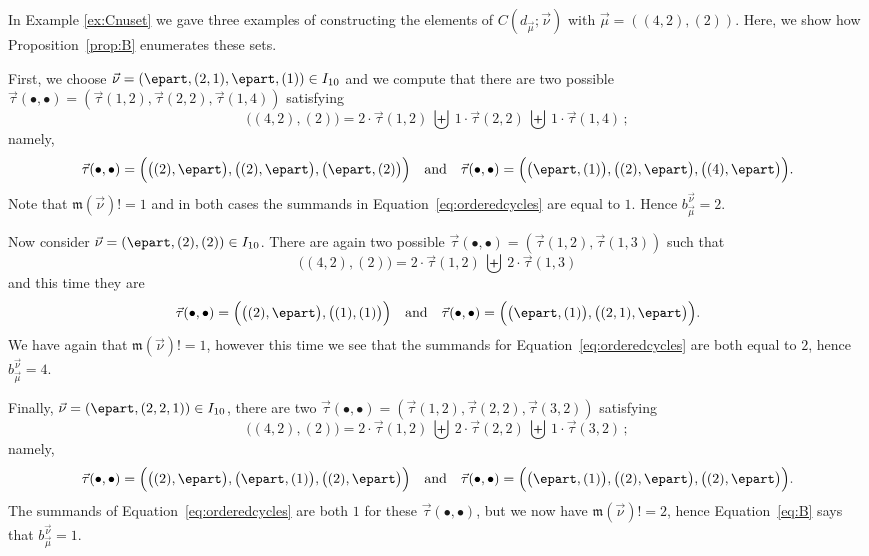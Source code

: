 \begin{example}  In Example \ref{ex:Cnuset} we gave three examples of
constructing the elements of $C( d_{\vec{\mu}}; \vec{\nu})$ with $\vec{\mu} = ((4,2), (2))$.
Here, we show
how Proposition~\ref{prop:B} enumerates these sets.

First, we choose $\vec{\nu} = (\epart, (2,1), \epart, (1)) \in I_{10}$
and we compute that there are two possible
$\vec{\tau}(\bullet, \bullet) = (\vec{\tau}(1,2), \vec{\tau}(2,2), \vec{\tau}(1,4))$
satisfying
\[
    \big((4, 2), (2)\big) =
    2 \cdot \vec{\tau}(1,2)~\biguplus~1 \cdot \vec{\tau}(2,2)~\biguplus~1 \cdot \vec{\tau}(1,4) \,;
\]
namely,
\begin{equation*}
    \vec{\tau}(\bullet, \bullet) = \Big(\big((2), \epart\big), \big((2), \epart\big), \big(\epart, (2)\big)\Big)
    \quad\text{and}\quad
    \vec{\tau}(\bullet, \bullet) = \Big(\big(\epart, (1)\big), \big((2), \epart \big), \big((4), \epart\big)\Big).
\end{equation*}
Note that $\mathfrak{m}(\vec{\nu})! = 1$ and in both cases
the summands in Equation~\eqref{eq:orderedcycles} are equal to $1$.
Hence $b_{\vec{\mu}}^{\vec{\nu}} = 2$.

Now consider $\vec{\nu} = (\epart, (2), (2)) \in I_{10}$.
There are again two possible $\vec{\tau}(\bullet, \bullet) = (\vec{\tau}(1,2), \vec{\tau}(1,3))$
such that
\[
\big((4, 2), (2)\big) = 2 \cdot \vec{\tau}(1,2)~\biguplus~2 \cdot \vec{\tau}(1,3)
\]
and this time they are
\begin{equation*}
    \vec{\tau}(\bullet, \bullet) = \Big(\big((2), \epart\big), \big((1), (1)\big)\Big)
    \quad\text{and}\quad
    \vec{\tau}(\bullet, \bullet) = \Big(\big(\epart, (1)\big), \big((2, 1), \epart\big)\Big).
\end{equation*}
We have again that $\mathfrak{m}(\vec{\nu})! = 1$,
however this time we see that the summands for Equation~\eqref{eq:orderedcycles}
are both equal to $2$, hence $b_{\vec{\mu}}^{\vec{\nu}} = 4$.

Finally,
$\vec{\nu} = (\epart, (2,2,1)) \in I_{10}$, there are two
$\vec{\tau}(\bullet, \bullet) = (\vec{\tau}(1,2), \vec{\tau}(2,2), \vec{\tau}(3,2))$ satisfying
\[
\big((4, 2), (2)\big) =
2 \cdot \vec{\tau}(1,2)~\biguplus~2 \cdot \vec{\tau}(2,2)~\biguplus~1 \cdot \vec{\tau}(3,2) \,;
\]
namely,
\begin{equation*}
    \vec{\tau}(\bullet, \bullet) = \Big(\big((2), \epart\big), \big(\epart, (1)\big), \big((2), \epart\big)\Big)
    \quad\text{and}\quad
    \vec{\tau}(\bullet, \bullet) = \Big(\big(\epart, (1)\big), \big((2), \epart \big), \big((2), \epart\big)\Big).
\end{equation*}
The summands of Equation~\eqref{eq:orderedcycles} are both $1$ for these $\vec{\tau}(\bullet, \bullet)$,
but we now have $\mathfrak{m}(\vec{\nu})! = 2$,
hence Equation~\eqref{eq:B} says that $b_{\vec{\mu}}^{\vec{\nu}} = 1$.
\end{example}

